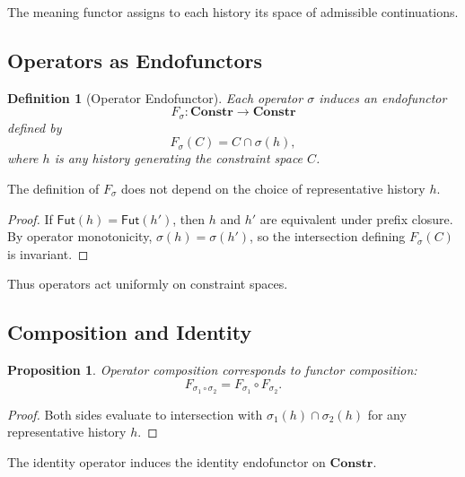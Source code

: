 \documentclass[11pt]{article}
\newtheorem{definition}{Definition}
\newtheorem{proposition}{Proposition}
\begin{document}
The meaning functor assigns to each history its space of admissible continuations.

\subsection{Operators as Endofunctors}

\begin{definition}[Operator Endofunctor]
Each operator $\sigma$ induces an endofunctor
\[
F_\sigma : \mathbf{Constr} \to \mathbf{Constr}
\]
defined by
\[
F_\sigma(C) = C \cap \sigma(h),
\]
where $h$ is any history generating the constraint space $C$.
\end{definition}

\begin{lemma}
The definition of $F_\sigma$ does not depend on the choice of representative
history $h$.
\end{lemma}

\begin{proof}
If $\mathsf{Fut}(h) = \mathsf{Fut}(h')$, then $h$ and $h'$ are equivalent under
prefix closure. By operator monotonicity, $\sigma(h) = \sigma(h')$, so the
intersection defining $F_\sigma(C)$ is invariant.
\end{proof}

Thus operators act uniformly on constraint spaces.

\subsection{Composition and Identity}

\begin{proposition}
Operator composition corresponds to functor composition:
\[
F_{\sigma_1 \circ \sigma_2} = F_{\sigma_1} \circ F_{\sigma_2}.
\]
\end{proposition}

\begin{proof}
Both sides evaluate to intersection with
$\sigma_1(h) \cap \sigma_2(h)$ for any representative history $h$.
\end{proof}

The identity operator induces the identity endofunctor on $\mathbf{Constr}$.

\end{document}
